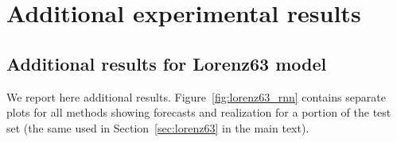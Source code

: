 \documentclass[twoside,11pt]{article}
\begin{document}
	
	\section{Additional experimental results}\label{app:exp_res}
	
	\subsection{Additional results for Lorenz63 model}\label{app:res_lorenz63}
	
	
	
	We report here additional results. Figure~\ref{fig:lorenz63_rnn} contains separate plots for all methods showing forecasts and realization for a portion of the test set (the same used in Section~\ref{sec:lorenz63} in the main text).
	
	
	
\end{document}
